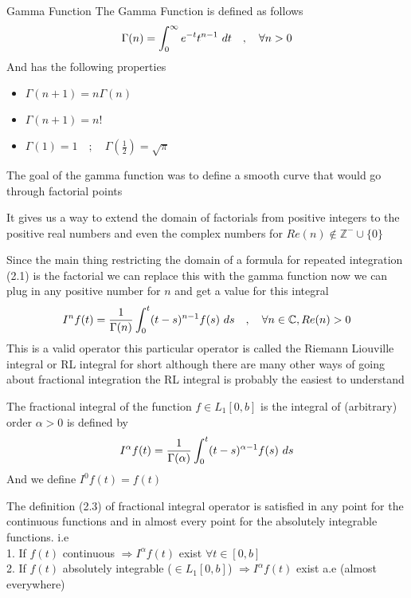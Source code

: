 \begin{enrichment*}{Gamma Function}
    The Gamma Function is defined as follows
    \[
    \Gamma(n) = \int_{0}^{\infty} e^{-t} t^{n-1} \,\, dt \quad , \quad \forall n>0
    \]  
    And has the following properties
    \begin{itemize}
        \item $\Gamma(n+1) = n \Gamma(n)$
        \item $\Gamma(n+1) = n!$
        \item $\Gamma(1) = 1 \quad;\quad \Gamma(\frac{1}{2}) = \sqrt{\pi} $
    \end{itemize}
    The goal of the gamma function was to define a smooth 
    curve that would go through factorial points 

    It gives us a way to extend the domain of factorials 
    from positive integers to the positive real numbers 
    and even the complex numbers for $Re(n) \notin \mathbb{Z}^- \cup \{0\} $ 
\end{enrichment*}
Since the main thing restricting the domain of a formula 
for repeated integration (2.1) is the factorial we can replace 
this with the gamma function now we can plug in any positive number 
for $n$ and get a value for this integral
\begin{equation}
    I^n f(t) = \frac{1}{\Gamma(n)}\int_{0}^{t} (t-s)^{n-1}f(s) \,\, ds \quad , \quad \forall n \in \mathbb{C} , Re(n)>0
\end{equation}
This is a valid operator this particular operator is called 
the Riemann Liouville integral or RL integral for short although 
there are many other ways of going about fractional integration 
the RL integral is probably the easiest to understand 



\begin{definition}
    The fractional integral of the function $f \in L_1[0, b]$ is the integral of (arbitrary) order
    $\alpha > 0$  is defined by
    \begin{equation}
        I^\alpha f(t) = \frac{1}{\Gamma(\alpha)}\int_{0}^{t} (t-s)^{\alpha-1}f(s) \,\, ds
    \end{equation}
    And we define $ I^0 f(t) = f(t)$
\end{definition}
\begin{lemma}
    The definition (2.3) of fractional integral operator is satisfied in any
    point for the continuous functions and in almost every point for the absolutely
    integrable functions. 
    i.e
    \\
    \hspace*{.3cm} 1. If $f(t)$ continuous $\Longrightarrow I^\alpha f(t)$ exist $\forall t \in [0, b]$
    \\
    \hspace*{.3cm} 2. If $f(t)$ absolutely integrable ($\in L_1[0, b]$) $\Longrightarrow I^\alpha f(t)$ exist a.e (almost everywhere)
\end{lemma}

